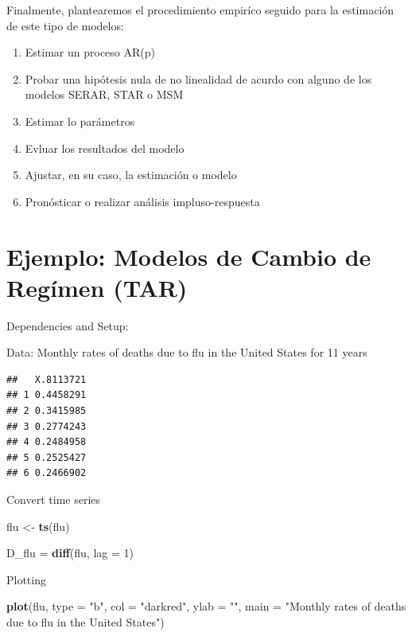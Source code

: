 \documentclass[
]{book}
\newenvironment{Shaded}{\begin{snugshade}}{\end{snugshade}}
\newcommand{\AttributeTok}[1]{\textcolor[rgb]{0.13,0.29,0.53}{#1}}
\newcommand{\DecValTok}[1]{\textcolor[rgb]{0.00,0.00,0.81}{#1}}
\newcommand{\FunctionTok}[1]{\textcolor[rgb]{0.13,0.29,0.53}{\textbf{#1}}}
\newcommand{\NormalTok}[1]{#1}
\newcommand{\OtherTok}[1]{\textcolor[rgb]{0.56,0.35,0.01}{#1}}
\newcommand{\StringTok}[1]{\textcolor[rgb]{0.31,0.60,0.02}{#1}}
\begin{document}
Finalmente, plantearemos el procedimiento empiríco seguido para la estimación de este tipo de modelos:

\begin{enumerate}
    \item Estimar un proceso AR(p)
    
    \item Probar una hipótesis nula de no linealidad de acurdo con alguno de los modelos SERAR, STAR o MSM
    
    \item Estimar lo parámetros
    
    \item Evluar los resultados del modelo
    
    \item Ajustar, en su caso, la estimación o modelo
    
    \item Pronósticar o realizar análisis impluso-respuesta
\end{enumerate}

\hypertarget{ejemplo-modelos-de-cambio-de-reguxedmen-tar}{%
\section{Ejemplo: Modelos de Cambio de Regímen (TAR)}\label{ejemplo-modelos-de-cambio-de-reguxedmen-tar}}

Dependencies and Setup:

Data: Monthly rates of deaths due to flu in the United States for 11 years

\begin{verbatim}
##   X.8113721
## 1 0.4458291
## 2 0.3415985
## 3 0.2774243
## 4 0.2484958
## 5 0.2525427
## 6 0.2466902
\end{verbatim}

Convert time series

\begin{Shaded}
\begin{Highlighting}[]
\NormalTok{flu }\OtherTok{\textless{}{-}} \FunctionTok{ts}\NormalTok{(flu)}

\NormalTok{D\_flu }\OtherTok{=} \FunctionTok{diff}\NormalTok{(flu, }\AttributeTok{lag =} \DecValTok{1}\NormalTok{)}
\end{Highlighting}
\end{Shaded}

Plotting

\begin{Shaded}
\begin{Highlighting}[]
\FunctionTok{plot}\NormalTok{(flu, }\AttributeTok{type =} \StringTok{"b"}\NormalTok{, }\AttributeTok{col =} \StringTok{"darkred"}\NormalTok{, }\AttributeTok{ylab =} \StringTok{""}\NormalTok{, }
     \AttributeTok{main =} \StringTok{"Monthly rates of deaths due to flu in the United States"}\NormalTok{)}
\end{Highlighting}
\end{Shaded}
\end{document}
